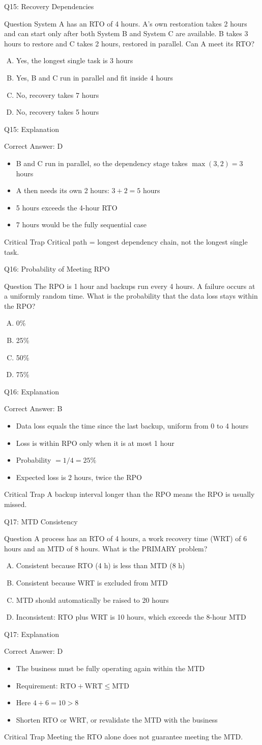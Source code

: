 \documentclass[aspectratio=169]{beamer}
\newcommand{\hq}[7]{%
	\begin{frame}{Q#1: #2}
		\begin{block}{Question}
			#3
		\end{block}
		\begin{enumerate}[(A)]
			#4
		\end{enumerate}
	\end{frame}
	\begin{frame}{Q#1: Explanation}
		\begin{block}{Correct Answer: #5}
			\begin{itemize}
				#6
			\end{itemize}
		\end{block}
		\begin{alertblock}{Critical Trap}
			#7
		\end{alertblock}
	\end{frame}
}
\begin{document}
	\hq{15}{Recovery Dependencies}
	{System A has an RTO of 4 hours. A's own restoration takes 2 hours and can start only after both System B and System C are available. B takes 3 hours to restore and C takes 2 hours, restored in parallel. Can A meet its RTO?}
	{\item Yes, the longest single task is 3 hours
		\item Yes, B and C run in parallel and fit inside 4 hours
		\item No, recovery takes 7 hours
		\item No, recovery takes 5 hours}
	{D}
	{\item B and C run in parallel, so the dependency stage takes $\max(3, 2) = 3$ hours
		\item A then needs its own 2 hours: $3 + 2 = 5$ hours
		\item 5 hours exceeds the 4-hour RTO
		\item 7 hours would be the fully sequential case}
	{Critical path = longest dependency chain, not the longest single task.}
	
	\hq{16}{Probability of Meeting RPO}
	{The RPO is 1 hour and backups run every 4 hours. A failure occurs at a uniformly random time. What is the probability that the data loss stays within the RPO?}
	{\item 0\%
		\item 25\%
		\item 50\%
		\item 75\%}
	{B}
	{\item Data loss equals the time since the last backup, uniform from 0 to 4 hours
		\item Loss is within RPO only when it is at most 1 hour
		\item Probability $= 1/4 = 25\%$
		\item Expected loss is 2 hours, twice the RPO}
	{A backup interval longer than the RPO means the RPO is usually missed.}
	
	\hq{17}{MTD Consistency}
	{A process has an RTO of 4 hours, a work recovery time (WRT) of 6 hours and an MTD of 8 hours. What is the PRIMARY problem?}
	{\item Consistent because RTO (4 h) is less than MTD (8 h)
		\item Consistent because WRT is excluded from MTD
		\item MTD should automatically be raised to 20 hours
		\item Inconsistent: RTO plus WRT is 10 hours, which exceeds the 8-hour MTD}
	{D}
	{\item The business must be fully operating again within the MTD
		\item Requirement: $\text{RTO} + \text{WRT} \leq \text{MTD}$
		\item Here $4 + 6 = 10 > 8$
		\item Shorten RTO or WRT, or revalidate the MTD with the business}
	{Meeting the RTO alone does not guarantee meeting the MTD.}
	
\end{document}
